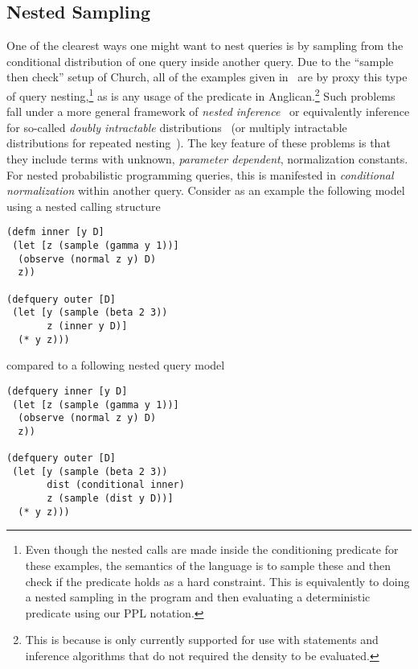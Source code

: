 \subsection{Nested Sampling}
\label{sec:design:imp:sampling}

One of the clearest ways one might want to nest queries is by sampling from the conditional
distribution of one query inside another query.  Due to the ``sample then check'' setup of
Church, all of the examples given in~\cite{stuhlmuller2014reasoning} are by proxy this
type of query nesting,\footnote{Even though the nested calls are made inside the conditioning
	predicate for these examples, the semantics of the language is to sample these
	and then check if the predicate holds as a hard constraint.  This is equivalently to doing a nested
	sampling in the program and then evaluating a deterministic predicate using our PPL notation.}
as is any usage of the \conditional predicate in Anglican.\footnote{This is because 
	\conditional is only currently supported for use
with \sample statements and inference algorithms that do not required the density to be evaluated.}
Such problems fall under a more general framework of \emph{nested inference}~\cite{mantadelis2011nesting} or equivalently inference for so-called
\emph{doubly intractable} distributions~\citep{murray2006mcmc} (or multiply intractable
	distributions for repeated nesting~\citep{stuhlmuller2014reasoning}).
	 The key feature of these problems is that they include
terms with unknown, \emph{parameter dependent}, normalization constants.  For nested probabilistic programming
queries, this is manifested in \emph{conditional normalization} within another query.
Consider as an example the following model using a nested calling structure
\vspace{-15pt}
\begin{lstlisting}[basicstyle=\ttfamily\footnotesize,multicols=2,frame=none]
(defm inner [y D]
 (let [z (sample (gamma y 1))]
  (observe (normal z y) D)
  z))

(defquery outer [D]
 (let [y (sample (beta 2 3))
       z (inner y D)]
  (* y z)))
\end{lstlisting}
\vspace{-25pt}
compared to a following nested query model
\vspace{-15pt}
\begin{lstlisting}[basicstyle=\ttfamily\footnotesize,multicols=2,frame=none]
(defquery inner [y D]
 (let [z (sample (gamma y 1))]
  (observe (normal z y) D)
  z))
  
(defquery outer [D]
 (let [y (sample (beta 2 3))
       dist (conditional inner)
       z (sample (dist y D))]
  (* y z)))
\end{lstlisting}
